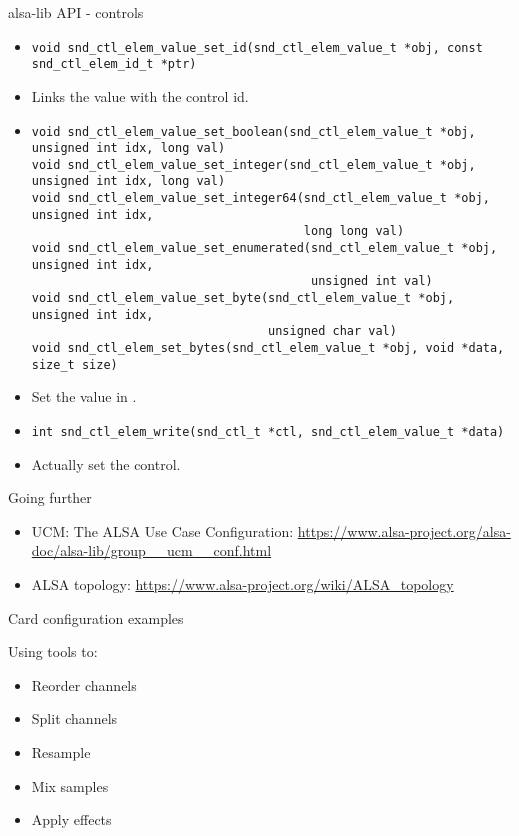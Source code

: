\begin{frame}[fragile]{alsa-lib API - controls}
  \begin{itemize}
  \item
    \begin{block}{}
    \fontsize{9}{9}\selectfont
      \begin{verbatim}
void snd_ctl_elem_value_set_id(snd_ctl_elem_value_t *obj, const snd_ctl_elem_id_t *ptr)
      \end{verbatim}
    \end{block}
    \item Links the value with the control id.
  \item
    \begin{block}{}
    \fontsize{9}{9}\selectfont
      \begin{verbatim}
void snd_ctl_elem_value_set_boolean(snd_ctl_elem_value_t *obj, unsigned int idx, long val)
void snd_ctl_elem_value_set_integer(snd_ctl_elem_value_t *obj, unsigned int idx, long val)
void snd_ctl_elem_value_set_integer64(snd_ctl_elem_value_t *obj, unsigned int idx,
                                      long long val)
void snd_ctl_elem_value_set_enumerated(snd_ctl_elem_value_t *obj, unsigned int idx,
                                       unsigned int val)
void snd_ctl_elem_value_set_byte(snd_ctl_elem_value_t *obj, unsigned int idx,
                                 unsigned char val)
void snd_ctl_elem_set_bytes(snd_ctl_elem_value_t *obj, void *data, size_t size)
      \end{verbatim}
    \end{block}
  \item Set the value in .
  \item
    \begin{block}{}
    \fontsize{9}{9}\selectfont
      \begin{verbatim}
int snd_ctl_elem_write(snd_ctl_t *ctl, snd_ctl_elem_value_t *data)
      \end{verbatim}
    \end{block}
  \item Actually set the control.
  \end{itemize}
\end{frame}

\begin{frame}{Going further}
  \begin{itemize}
  \item UCM: The ALSA Use Case Configuration:
    \url{https://www.alsa-project.org/alsa-doc/alsa-lib/group__ucm__conf.html}
  \item ALSA topology:
    \url{https://www.alsa-project.org/wiki/ALSA_topology}
  \end{itemize}
\end{frame}

\setupdemoframe
{Card configuration examples}
{
  Using  tools to:
  \begin{itemize}
  \item Reorder channels
  \item Split channels
  \item Resample
  \item Mix samples
  \item Apply effects
  \end{itemize}
}
